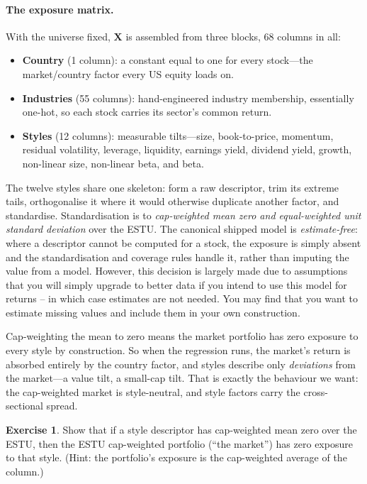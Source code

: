 \documentclass[11pt]{article}
\theoremstyle{definition}
\newtheorem{exercise}{Exercise}[section]
\theoremstyle{plain}
\theoremstyle{remark}
\newcommand{\Xmat}{\mathbf{X}}
\begin{document}
\paragraph{The exposure matrix.} With the universe fixed, $\Xmat$ is assembled from three blocks, $68$ columns in all:
\begin{itemize}[leftmargin=1.4em,nosep]
  \item \textbf{Country} (1 column): a constant equal to one for every stock---the market/country factor every US equity loads on.
  \item \textbf{Industries} (55 columns): hand-engineered industry membership, essentially one-hot, so each stock carries its sector's common return.
  \item \textbf{Styles} (12 columns): measurable tilts---size, book-to-price, momentum, residual volatility, leverage, liquidity, earnings yield, dividend yield, growth, non-linear size, non-linear beta, and beta.
\end{itemize}

The twelve styles share one skeleton: form a raw descriptor, trim its extreme tails, orthogonalise it where it would otherwise duplicate another factor, and standardise. Standardisation is to \emph{cap-weighted mean zero and equal-weighted unit standard deviation} over the ESTU. The canonical shipped model is \emph{estimate-free}: where a descriptor cannot be computed for a stock, the exposure is simply absent and the standardisation and coverage rules handle it, rather than imputing the value from a model. However, this decision is largely made due to assumptions that you will simply upgrade to better data if you intend to use this model for returns -- in which case estimates are not needed. You may find that you want to estimate missing values and include them in your own construction.

\begin{intuition}
Cap-weighting the mean to zero means the market portfolio has zero exposure to every style by construction. So when the regression runs, the market's return is absorbed entirely by the country factor, and styles describe only \emph{deviations} from the market---a value tilt, a small-cap tilt. That is exactly the behaviour we want: the cap-weighted market is style-neutral, and style factors carry the cross-sectional spread.
\end{intuition}

\begin{exercise}
Show that if a style descriptor has cap-weighted mean zero over the ESTU, then the ESTU cap-weighted portfolio (``the market'') has zero exposure to that style. (Hint: the portfolio's exposure is the cap-weighted average of the column.)
\end{exercise}
\end{document}
